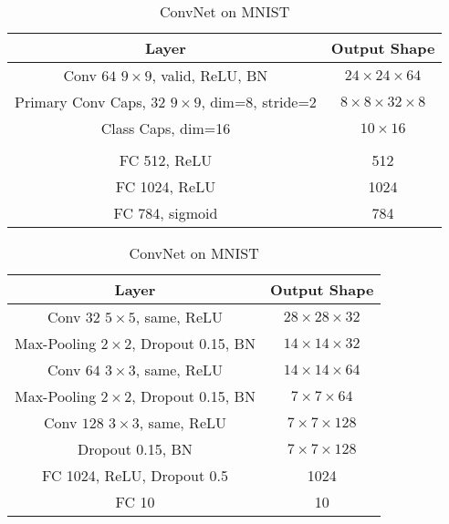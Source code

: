 \begin{table}

	\caption{CapsNet on MNIST}
	\begin{tabular}{|c|c|}
		\hline 
		Layer	&  Output Shape \\ 
		\hline 
		Conv $64$ $9\times9$, valid, ReLU, BN & $24\times24\times64$ \\ 
		\hline 
		Primary Conv Caps, $32$ $9\times9$, dim=$8$, stride=2	&  $8\times8\times32\times8$ \\ 
		\hline 
		Class Caps, dim=16	& $10\times16$ \\ 
		\hline 
		& \\
		\hline
		FC 512, ReLU	& 512 \\
		\hline
		FC 1024, ReLU	& 1024 \\
		\hline
		FC 784, sigmoid	& 784 \\
		\hline
	\end{tabular} 

	\caption{ConvNet on MNIST}
	\begin{tabular}{|c|c|}
		\hline 
		Layer	&  Output Shape \\ 
		\hline 
		Conv $32$ $5\times5$, same,	ReLU & $28\times28\times32$ \\ 
		\hline 
		Max-Pooling $2\times2$, Dropout 0.15, BN	&  $14\times14\times32$ \\ 
		\hline 
		Conv $64$ $3\times3$, same, ReLU	& $14\times14\times64$ \\ 
		\hline 
		Max-Pooling $2\times2$, Dropout 0.15, BN	& $7\times7\times64$ \\
		\hline
		Conv $128$ $3\times3$, same, ReLU	& $7\times7\times128$ \\
		\hline
		Dropout 0.15, BN	& $7\times7\times128$ \\
		\hline
		FC 1024, ReLU, Dropout 0.5 & 1024 \\
		\hline
		FC 10 & 10\\
		\hline
	\end{tabular} 

\end{table}

